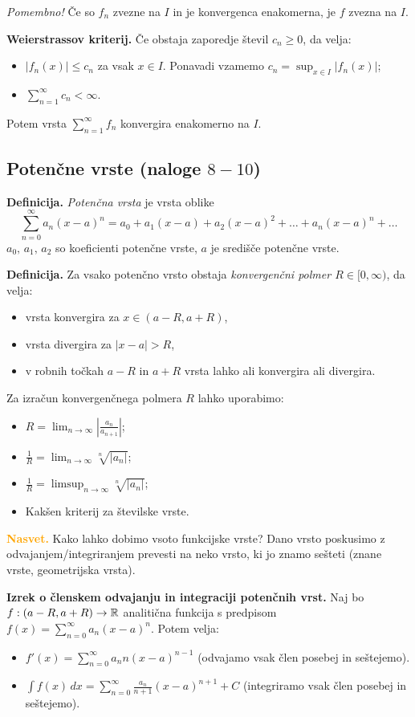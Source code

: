 \emph{Pomembno!} Če so $f_n$ zvezne na $I$ in je konvergenca enakomerna, je $f$ zvezna na $I$.

\textbf{Weierstrassov kriterij.} Če obstaja zaporedje števil $c_n \geq 0$, da velja:
\begin{itemize}
    \item $|f_n(x)| \leq c_n$ za vsak $x \in I$. Ponavadi vzamemo $c_n = \sup_{x \in I} |f_n(x)|$;
    \item $\sum_{n=1}^{\infty} c_n < \infty$.
\end{itemize}
Potem vrsta $\sum_{n=1}^{\infty}f_n$ konvergira enakomerno na $I$.

{\color{Purple} \subsection*{Potenčne vrste (naloge $8-10$)}}
\textbf{Definicija.} \emph{Potenčna vrsta} je vrsta oblike $$\sum_{n=0}^{\infty} a_n (x-a)^n = a_0 + a_1(x-a) + a_2(x-a)^2 + \ldots + a_n(x-a)^n + \ldots$$
$a_0, \, a_1, \, a_2$ so koeficienti potenčne vrste, $a$ je središče potenčne vrste.

\textbf{Definicija.} Za vsako potenčno vrsto obstaja \emph{konvergenčni polmer $R \in [0, \infty)$}, da velja:
\begin{itemize}
    \item vrsta konvergira za $x \in (a-R, a+R)$,
    \item vrsta divergira za $|x-a|>R$,
    \item v robnih točkah $a-R$ in $a+R$ vrsta lahko ali konvergira ali divergira.
\end{itemize}
Za izračun konvergenčnega polmera $R$ lahko uporabimo:
\begin{itemize}
    \item $R = \lim_{n \to \infty} \left| \frac{a_n}{a_{n+1}} \right|$;
    \item $\frac{1}{R} =\lim_{n \to \infty} \sqrt[n]{|a_n|}$;
    \item $\frac{1}{R} = \limsup_{n \to \infty} \sqrt[n]{|a_n|}$;
    \item Kakšen kriterij za številske vrste.
\end{itemize}

\textbf{\textcolor{Orange}{Nasvet.}} Kako lahko dobimo vsoto funkcijske vrste? Dano vrsto poskusimo z odvajanjem/integriranjem prevesti na neko vrsto, ki jo znamo sešteti (znane vrste, geometrijska vrsta).

\textbf{Izrek o členskem odvajanju in integraciji potenčnih vrst.} Naj bo $f:(a-R, a+R) \to \mathbb{R}$ analitična funkcija s predpisom $f(x) = \sum_{n=0}^{\infty} a_n(x-a)^n$. Potem velja:
\begin{itemize}
    \item $\displaystyle f'(x) = \sum_{n=0}^{\infty} a_n n (x-a)^{n-1}$ (odvajamo vsak člen posebej in seštejemo).
    \item $\displaystyle \int f(x) \, dx = \sum_{n=0}^{\infty} \frac{a_n}{n+1}(x-a)^{n+1} + C$ (integriramo vsak člen posebej in seštejemo).
\end{itemize}

